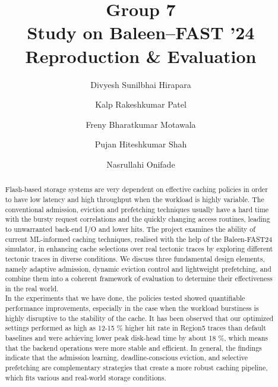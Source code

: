 \documentclass[sigconf]{acmart}
\title{Group 7\\Study on Baleen–FAST ’24 Reproduction & Evaluation}
\author{Divyesh Sunilbhai Hirapara}
\affiliation{ \institution{Fairleigh Dickinson University} \city{Vancouver} \country{Canada} }
\author{Kalp Rakeshkumar Patel}
\affiliation{ \institution{Fairleigh Dickinson University} \city{Vancouver} \country{Canada} }
\author{Freny Bharatkumar Motawala}
\affiliation{ \institution{Fairleigh Dickinson University} \city{Vancouver} \country{Canada} }
\author{Pujan Hiteshkumar Shah}
\affiliation{ \institution{Fairleigh Dickinson University} \city{Vancouver} \country{Canada} }
\author{Nasrullahi Onifade}
\affiliation{ \institution{Fairleigh Dickinson University} \city{Vancouver} \country{Canada} }
\begin{document}
{\begin{abstract}
\large Flash-based storage systems are very dependent on effective caching policies in order to have low latency and high throughput when the workload is highly variable. The conventional admission, eviction and prefetching techniques usually have a hard time with the bursty request correlations and the quickly changing access routines, leading to unwarranted back-end I/O and lower hits. The project examines the ability of current ML-informed caching techniques, realised with the help of the Baleen-FAST24 simulator, in enhancing cache selections over real tectonic traces by exploring different tectonic traces in diverse conditions. We discuss three fundamental design elements, namely adaptive admission, dynamic eviction control and lightweight prefetching, and combine them into a coherent framework of evaluation to determine their effectiveness in the real world.\\\indent In the experiments that we have done, the policies tested showed quantifiable performance improvements, especially in the case when the workload burstiness is highly disruptive to the stability of the cache. It has been observed that our optimized settings performed as high as 12-15 \% higher hit rate in Region5 traces than default baselines and were achieving lower peak disk-head time by about 18 \%, which means that the backend operations were more stable and efficient. In general, the findings indicate that the admission learning, deadline-conscious eviction, and selective prefetching are complementary strategies that create a more robust caching pipeline, which fits various and real-world storage conditions.\\
\end{abstract}

\maketitle
\fancyhead{} \fancyfoot[C]{\thepage}

\clearpage
}
\end{document}
